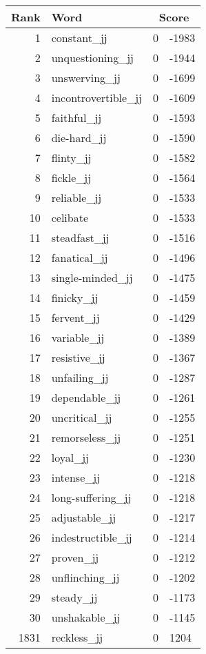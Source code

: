 \begin{longtable}[!htbp]{| rlr@{.}l |}
    \hline
    \textbf{Rank} & \textbf{Word} & \multicolumn{2}{c|}{\textbf{Score}} \\
    \hline
    \endhead
    1 & constant\_jj & 0 & -1983 \\
    2 & unquestioning\_jj & 0 & -1944 \\
    3 & unswerving\_jj & 0 & -1699 \\
    4 & incontrovertible\_jj & 0 & -1609 \\
    5 & faithful\_jj & 0 & -1593 \\
    6 & die-hard\_jj & 0 & -1590 \\
    7 & flinty\_jj & 0 & -1582 \\
    8 & fickle\_jj & 0 & -1564 \\
    9 & reliable\_jj & 0 & -1533 \\
    10 & celibate & 0 & -1533 \\
    11 & steadfast\_jj & 0 & -1516 \\
    12 & fanatical\_jj & 0 & -1496 \\
    13 & single-minded\_jj & 0 & -1475 \\
    14 & finicky\_jj & 0 & -1459 \\
    15 & fervent\_jj & 0 & -1429 \\
    16 & variable\_jj & 0 & -1389 \\
    17 & resistive\_jj & 0 & -1367 \\
    18 & unfailing\_jj & 0 & -1287 \\
    19 & dependable\_jj & 0 & -1261 \\
    20 & uncritical\_jj & 0 & -1255 \\
    21 & remorseless\_jj & 0 & -1251 \\
    22 & loyal\_jj & 0 & -1230 \\
    23 & intense\_jj & 0 & -1218 \\
    24 & long-suffering\_jj & 0 & -1218 \\
    25 & adjustable\_jj & 0 & -1217 \\
    26 & indestructible\_jj & 0 & -1214 \\
    27 & proven\_jj & 0 & -1212 \\
    28 & unflinching\_jj & 0 & -1202 \\
    29 & steady\_jj & 0 & -1173 \\
    30 & unshakable\_jj & 0 & -1145 \\
    1831 & reckless\_jj & 0 & 1204 \\

\end{longtable}
